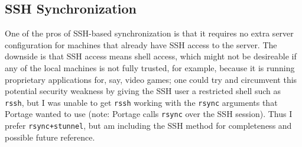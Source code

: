 \documentclass{article}
\begin{document}
\subsection{SSH Synchronization}
One of the pros of SSH-based synchronization is that it requires no extra server configuration for machines that already have SSH access to the server.  The downside is that SSH access means shell access, which might not be desireable if any of the local machines is not fully trusted, for example, because it is running proprietary applications for, say, video games; one could try and circumvent this potential security weakness by giving the SSH user a restricted shell such as \texttt{rssh}, but I was unable to get \texttt{rssh} working with the \texttt{rsync} arguments that Portage wanted to use (note: Portage calls \texttt{rsync} over the SSH session).  Thus I prefer \texttt{rsync+stunnel}, but am including the SSH method for completeness and possible future reference.
\end{document}
